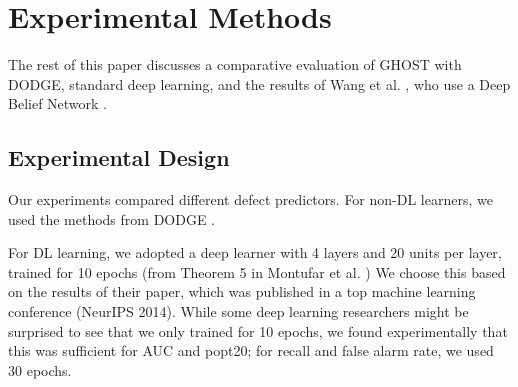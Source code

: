 \documentclass[10pt,compsoc,twocolumn]{IEEEtran}
\begin{document}


\section{Experimental Methods}
\label{sec:method}

The rest of this paper
discusses a comparative evaluation
of GHOST with DODGE, standard deep learning, and the results of Wang et al. \cite{wang2018deep}, who use a Deep Belief Network \cite{hinton2009deep}.



\subsection{Experimental Design}

Our experiments  compared different defect predictors. For non-DL learners, we used the  methods from DODGE \cite{agrawal2019dodge}.


 For DL learning, we adopted a deep learner with 4 layers and 20 units per layer, trained for 10 epochs (from Theorem 5 in Montufar et al. \cite{montufar2014number}) We choose this based on the results of their paper, which was published in a top machine learning conference (NeurIPS 2014). While some deep learning researchers might be surprised to see that we only trained for 10 epochs, we found experimentally that this was sufficient for AUC and popt20; for recall and false alarm rate, we used 30 epochs.
\end{document}
